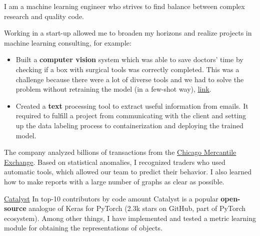 \documentclass[10pt,a4paper,ragged2e,withhyper]{altacv}
\begin{document}


\makecvheader


\smallskip
I am a machine learning engineer who strives to find balance between complex research and quality code.

\begin{paracol}{2}


Working in a start-up allowed me to broaden my horizons and realize projects in machine learning consulting, for example:
\begin{itemize}
\item Built a \textbf{computer vision} system which was able to save doctors' time by checking if a box with surgical tools was correctly completed. This was a challenge because there were a lot of diverse tools and we had to solve the problem without retraining the model (in a few-shot way), \href{https://drive.google.com/file/d/1FBNRTkxkGzzfVHlrwJCauK7xjBWkI7xO/view?usp=sharing}{\underline{link}}.
\item Created a \textbf{text} processing tool to extract useful information from emails. It required to fulfill a project from communicating with the client and setting up the data labeling process to containerization and deploying the trained model.
\end{itemize}

\divider

The company analyzed billions of transactions from the \href{https://en.wikipedia.org/wiki/Chicago_Mercantile_Exchange}
{Chicago Mercantile Exchange}.
Based on statistical anomalies, I recognized traders who used automatic tools, which allowed our team to predict their behavior.
I also learned how to make reports with a large number of graphs as clear as possible.


\cvevent
{\href{https://github.com/catalyst-team/catalyst}{Catalyst}}
{In top-10 contributors by code amount}{}{}
Catalyst is a popular \textbf{open-source} analogue of Keras for PyTorch (2.3k stars on GitHub, part of PyTorch ecosystem).
Among other things, I have implemented and tested a metric learning module for obtaining the representations of objects.
\smallskip


\end{paracol}
\end{document}
